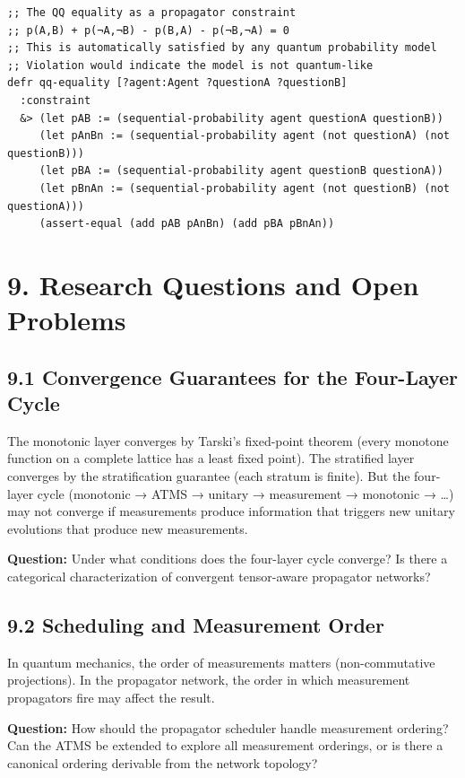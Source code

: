 \documentclass[11pt]{article}
\begin{document}
\begin{verbatim}
;; The QQ equality as a propagator constraint
;; p(A,B) + p(¬A,¬B) - p(B,A) - p(¬B,¬A) = 0
;; This is automatically satisfied by any quantum probability model
;; Violation would indicate the model is not quantum-like
defr qq-equality [?agent:Agent ?questionA ?questionB]
  :constraint
  &> (let pAB := (sequential-probability agent questionA questionB))
     (let pAnBn := (sequential-probability agent (not questionA) (not questionB)))
     (let pBA := (sequential-probability agent questionB questionA))
     (let pBnAn := (sequential-probability agent (not questionB) (not questionA)))
     (assert-equal (add pAB pAnBn) (add pBA pBnAn))
\end{verbatim}
\section{9. Research Questions and Open Problems}
\label{sec:orga81269b}

\subsection{9.1 Convergence Guarantees for the Four-Layer Cycle}
\label{sec:org8b3b433}

The monotonic layer converges by Tarski's fixed-point theorem (every monotone
function on a complete lattice has a least fixed point). The stratified layer
converges by the stratification guarantee (each stratum is finite). But the
four-layer cycle (monotonic → ATMS → unitary → measurement → monotonic → \ldots{})
may not converge if measurements produce information that triggers new unitary
evolutions that produce new measurements.

\textbf{Question:} Under what conditions does the four-layer cycle converge? Is there
a categorical characterization of convergent tensor-aware propagator networks?
\subsection{9.2 Scheduling and Measurement Order}
\label{sec:org787766b}

In quantum mechanics, the order of measurements matters (non-commutative
projections). In the propagator network, the order in which measurement
propagators fire may affect the result.

\textbf{Question:} How should the propagator scheduler handle measurement ordering?
Can the ATMS be extended to explore all measurement orderings, or is there a
canonical ordering derivable from the network topology?
\end{document}
